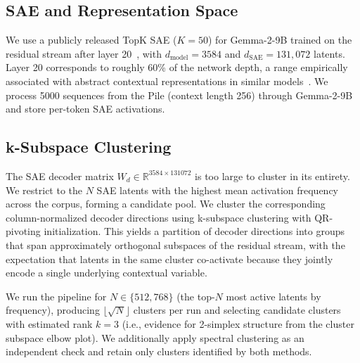 \documentclass{article}
\newcommand{\R}{\mathbb{R}}
\begin{document}
\subsection{SAE and Representation Space}
\label{sec:real_sae}

We use a publicly released TopK SAE ($K=50$) for Gemma-2-9B trained on the
residual stream after layer 20~\citep{saelens2024}, with $d_{\mathrm{model}} = 3584$
and $d_{\mathrm{SAE}} = 131{,}072$ latents.  Layer 20 corresponds to roughly 60\% of
the network depth, a range empirically associated with abstract contextual
representations in similar models~\citep{ferrando2024}.  We process 5000 sequences
from the Pile (context length 256) through Gemma-2-9B and store per-token SAE
activations.

\subsection{k-Subspace Clustering}
\label{sec:real_cluster}

The SAE decoder matrix $W_d \in \R^{3584 \times 131072}$ is too large to cluster in
its entirety.  We restrict to the $N$ SAE latents with the highest mean activation
frequency across the corpus, forming a candidate pool.  We cluster the corresponding
column-normalized decoder directions using k-subspace clustering with QR-pivoting
initialization.  This yields a partition of decoder directions into groups that
span approximately orthogonal subspaces of the residual stream, with the expectation
that latents in the same cluster co-activate because they jointly encode a single
underlying contextual variable.

We run the pipeline for $N \in \{512, 768\}$ (the top-$N$ most active latents by
frequency), producing $\lfloor\sqrt{N}\rfloor$ clusters per run and selecting
candidate clusters with estimated rank $k = 3$ (i.e., evidence for 2-simplex
structure from the cluster subspace elbow plot).  We additionally apply spectral
clustering as an independent check and retain only clusters identified by both
methods.
\end{document}
